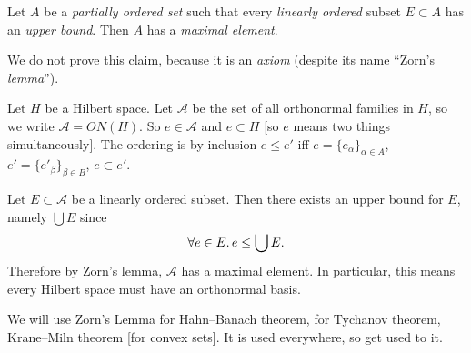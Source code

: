 \begin{claim}
Let $A$ be a \emph{partially ordered set} such that every
\emph{linearly ordered} subset $E\subset A$ has an \emph{upper bound}.
Then $A$ has a \emph{maximal element}.
\end{claim}

\begin{node}
We do not prove this claim, because it is an \emph{axiom} (despite its
name ``Zorn's \emph{lemma}'').
\end{node}

\begin{example}
Let $H$ be a Hilbert space.
Let $\mathcal{A}$ be the set of all orthonormal families in $H$, so we
write $\mathcal{A}=ON(H)$. So $e\in\mathcal{A}$ and $e\subset H$ [so
  $e$ means two things simultaneously].
The ordering is by inclusion $e\leq e'$ iff
$e=\{e_{\alpha}\}_{\alpha\in A}$, $e'=\{e'_{\beta}\}_{\beta\in B}$,
$e\subset e'$.

Let $E\subset\mathcal{A}$ be a linearly ordered subset. Then there
exists an upper bound for $E$, namely $\bigcup E$ since
\begin{equation}
\forall e\in E\ldotp e\leq\bigcup E.
\end{equation}
Therefore by Zorn's lemma, $\mathcal{A}$ has a maximal element. In
particular, this means every Hilbert space must have an orthonormal basis.
\end{example}

\begin{note}
We will use Zorn's Lemma for Hahn--Banach theorem, for Tychanov
theorem, Krane--Miln theorem [for convex sets]. It is used everywhere,
so get used to it.
\end{note}